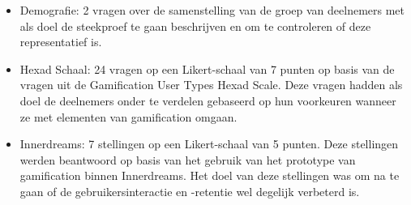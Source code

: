 \begin{itemize}
    \item Demografie: 2 vragen over de samenstelling van de groep van deelnemers met als doel de steekproef te gaan beschrijven en om te controleren of deze representatief is.
    \item Hexad Schaal: 24 vragen op een Likert-schaal van 7 punten op basis van de vragen uit de Gamification User Types Hexad Scale. Deze vragen hadden als doel de deelnemers onder te verdelen gebaseerd op hun voorkeuren wanneer ze met elementen van gamification omgaan.
    \item Innerdreams: 7 stellingen op een Likert-schaal van 5 punten. Deze stellingen werden beantwoord op basis van het gebruik van het prototype van gamification binnen Innerdreams. Het doel van deze stellingen was om na te gaan of de gebruikersinteractie en -retentie wel degelijk verbeterd is.
\end{itemize}
